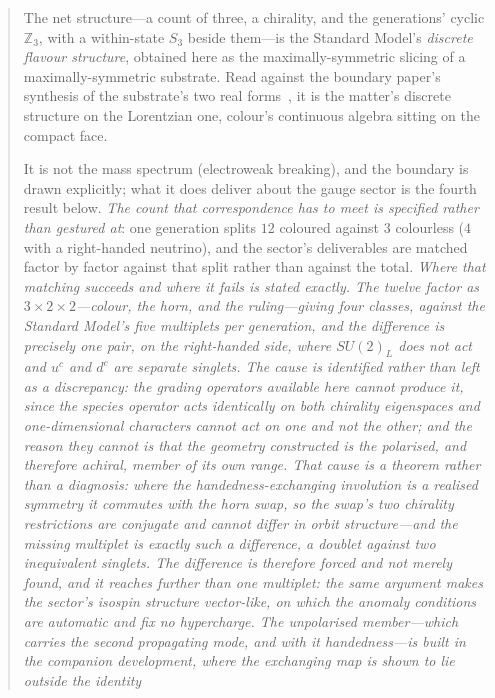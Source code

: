 \documentclass[11pt]{article}
\begin{document}
\begin{abstract}
The net structure---a count of three, a chirality, and the generations' cyclic $\mathbb{Z}_3$, with a within-state $S_3$ beside them---is the Standard Model's \emph{discrete flavour structure}, obtained here as the maximally-symmetric slicing of a maximally-symmetric substrate. Read against the boundary paper's synthesis of the substrate's two real forms~\cite{JanzenBoundary}, it is the matter's discrete structure on the Lorentzian one, colour's continuous algebra sitting on the compact face. 

It is not the mass spectrum (electroweak breaking), and the boundary is drawn explicitly; what it does deliver about the gauge sector is the fourth result below. \emph{The count that correspondence has to meet is specified rather than gestured at}: one generation splits $12$ coloured against $3$ colourless ($4$ with a right-handed neutrino), and the sector's deliverables are matched factor by factor against that split rather than against the total.
\emph{Where that matching succeeds and where it fails is stated exactly.
The twelve factor as $3\times2\times2$---colour, the horn, and the ruling---giving four
classes, against the Standard Model's five multiplets per generation, and the difference is
precisely one pair, on the right-handed side, where $SU(2)_L$ does not act and $u^c$ and $d^c$
are separate singlets.  The cause is identified rather than left as a discrepancy: the grading
operators available here cannot produce it, since the species operator acts identically on both
chirality eigenspaces and one-dimensional characters cannot act on one and not the other; and
the reason they cannot is that the geometry constructed is the polarised, and therefore
achiral, member of its own range.  \emph{That cause is a theorem rather than a diagnosis}:
where the handedness-exchanging involution is a realised symmetry it commutes with the horn
swap, so the swap's two chirality restrictions are conjugate and cannot differ in orbit
structure---and the missing multiplet is exactly such a difference, a doublet against two
inequivalent singlets.  The difference is therefore forced and not merely found, and it reaches
further than one multiplet: the same argument makes the sector's isospin structure vector-like,
on which the anomaly conditions are automatic and fix no hypercharge.  The unpolarised
member---which carries the second propagating mode, and with it handedness---is built in the
companion development, where the exchanging map is shown to lie outside the identity
}
\end{abstract}
\end{document}
